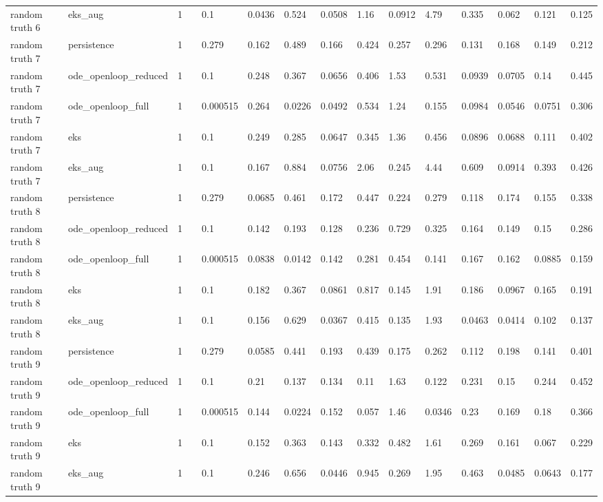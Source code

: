 \begin{table}[t]
\begin{tabular}{lllllllllllllll}
random truth 6 & eks\_aug & 1 &  & 0.1 & 0.0436 & 0.524 & 0.0508 & 1.16 & 0.0912 & 4.79 & 0.335 & 0.062 & 0.121 & 0.125 \\
random truth 7 & persistence & 1 &  & 0.279 & 0.162 & 0.489 & 0.166 & 0.424 & 0.257 & 0.296 & 0.131 & 0.168 & 0.149 & 0.212 \\
random truth 7 & ode\_openloop\_reduced & 1 &  & 0.1 & 0.248 & 0.367 & 0.0656 & 0.406 & 1.53 & 0.531 & 0.0939 & 0.0705 & 0.14 & 0.445 \\
random truth 7 & ode\_openloop\_full & 1 &  & 0.000515 & 0.264 & 0.0226 & 0.0492 & 0.534 & 1.24 & 0.155 & 0.0984 & 0.0546 & 0.0751 & 0.306 \\
random truth 7 & eks & 1 &  & 0.1 & 0.249 & 0.285 & 0.0647 & 0.345 & 1.36 & 0.456 & 0.0896 & 0.0688 & 0.111 & 0.402 \\
random truth 7 & eks\_aug & 1 &  & 0.1 & 0.167 & 0.884 & 0.0756 & 2.06 & 0.245 & 4.44 & 0.609 & 0.0914 & 0.393 & 0.426 \\
random truth 8 & persistence & 1 &  & 0.279 & 0.0685 & 0.461 & 0.172 & 0.447 & 0.224 & 0.279 & 0.118 & 0.174 & 0.155 & 0.338 \\
random truth 8 & ode\_openloop\_reduced & 1 &  & 0.1 & 0.142 & 0.193 & 0.128 & 0.236 & 0.729 & 0.325 & 0.164 & 0.149 & 0.15 & 0.286 \\
random truth 8 & ode\_openloop\_full & 1 &  & 0.000515 & 0.0838 & 0.0142 & 0.142 & 0.281 & 0.454 & 0.141 & 0.167 & 0.162 & 0.0885 & 0.159 \\
random truth 8 & eks & 1 &  & 0.1 & 0.182 & 0.367 & 0.0861 & 0.817 & 0.145 & 1.91 & 0.186 & 0.0967 & 0.165 & 0.191 \\
random truth 8 & eks\_aug & 1 &  & 0.1 & 0.156 & 0.629 & 0.0367 & 0.415 & 0.135 & 1.93 & 0.0463 & 0.0414 & 0.102 & 0.137 \\
random truth 9 & persistence & 1 &  & 0.279 & 0.0585 & 0.441 & 0.193 & 0.439 & 0.175 & 0.262 & 0.112 & 0.198 & 0.141 & 0.401 \\
random truth 9 & ode\_openloop\_reduced & 1 &  & 0.1 & 0.21 & 0.137 & 0.134 & 0.11 & 1.63 & 0.122 & 0.231 & 0.15 & 0.244 & 0.452 \\
random truth 9 & ode\_openloop\_full & 1 &  & 0.000515 & 0.144 & 0.0224 & 0.152 & 0.057 & 1.46 & 0.0346 & 0.23 & 0.169 & 0.18 & 0.366 \\
random truth 9 & eks & 1 &  & 0.1 & 0.152 & 0.363 & 0.143 & 0.332 & 0.482 & 1.61 & 0.269 & 0.161 & 0.067 & 0.229 \\
random truth 9 & eks\_aug & 1 &  & 0.1 & 0.246 & 0.656 & 0.0446 & 0.945 & 0.269 & 1.95 & 0.463 & 0.0485 & 0.0643 & 0.177 \\

\end{tabular}
\end{table}
